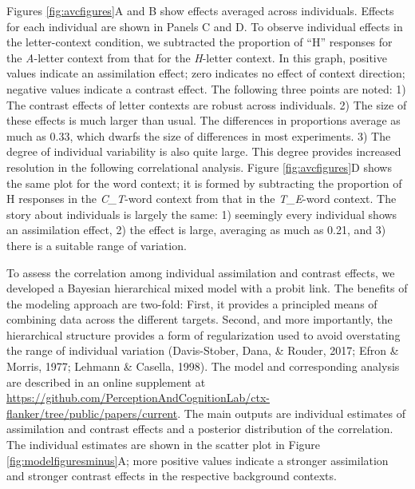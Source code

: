 \documentclass[english,floatsintext,man]{apa6}
\theoremstyle{definition}
\theoremstyle{definition}
\theoremstyle{remark}
\begin{document}
Figures \ref{fig:avcfigures}A and B show effects averaged across
individuals. Effects for each individual are shown in Panels C and D. To
observe individual effects in the letter-context condition, we
subtracted the proportion of \enquote{H} responses for the
\emph{A}-letter context from that for the \emph{H}-letter context. In
this graph, positive values indicate an assimilation effect; zero
indicates no effect of context direction; negative values indicate a
contrast effect. The following three points are noted: 1) The contrast
effects of letter contexts are robust across individuals. 2) The size of
these effects is much larger than usual. The differences in proportions
average as much as 0.33, which dwarfs the size of differences in most
experiments. 3) The degree of individual variability is also quite
large. This degree provides increased resolution in the following
correlational analysis. Figure \ref{fig:avcfigures}D shows the same plot
for the word context; it is formed by subtracting the proportion of H
responses in the \emph{C\_T}-word context from that in the
\emph{T\_E}-word context. The story about individuals is largely the
same: 1) seemingly every individual shows an assimilation effect, 2) the
effect is large, averaging as much as 0.21, and 3) there is a suitable
range of variation.

To assess the correlation among individual assimilation and contrast
effects, we developed a Bayesian hierarchical mixed model with a probit
link. The benefits of the modeling approach are two-fold: First, it
provides a principled means of combining data across the different
targets. Second, and more importantly, the hierarchical structure
provides a form of regularization used to avoid overstating the range of
individual variation (Davis-Stober, Dana, \& Rouder, 2017; Efron \&
Morris, 1977; Lehmann \& Casella, 1998). The model and corresponding
analysis are described in an online supplement at
\url{https://github.com/PerceptionAndCognitionLab/ctx-flanker/tree/public/papers/current}.
The main outputs are individual estimates of assimilation and contrast
effects and a posterior distribution of the correlation. The individual
estimates are shown in the scatter plot in Figure
\ref{fig:modelfiguresminus}A; more positive values indicate a stronger
assimilation and stronger contrast effects in the respective background
contexts.
\end{document}
